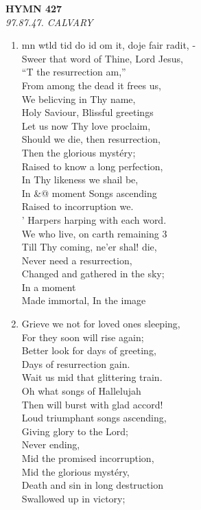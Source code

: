 \documentclass[11pt,a4paper]{article}
\begin{document}
\newpage
\begin{center}
    {\Large \textbf{HYMN 427}}
    \\
    \textit{97.87.47. CALVARY}
\end{center}
\vspace{1em}

\begin{enumerate}
    \item mn wtld tid do id om it, doje fair radit, - \\
        Sweer that word of Thine, Lord Jesus, \\
        ``T the resurrection am,'' \\
        From among the dead it frees us, \\
        We belicving in Thy name, \\
        Holy Saviour, Blissful greetings \\
        Let us now Thy love proclaim, \\
        Should we die, then resurrection, \\
        Then the glorious mystéry; \\
        Raised to know a long perfection, \\
        In Thy likeness we shail be, \\
        In \&@ moment Songs ascending \\
        Raised to incorruption we. \\
        ' Harpers harping with each word. \\
        We who live, on carth remaining 3 \\
        Till Thy coming, ne'er shal! die, \\
        Never need a resurrection, \\
        Changed and gathered in the sky; \\
        In a moment \\
        Made immortal, In the image

    \item Grieve we not for loved ones sleeping, \\
        For they soon will rise again; \\
        Better look for days of greeting, \\
        Days of resurrection gain. \\
        Wait us mid that glittering train. \\
        Oh what songs of Hallelujah \\
        Then will burst with glad accord! \\
        Loud triumphant songs ascending, \\
        Giving glory to the Lord; \\
        Never ending, \\
        Mid the promised incorruption, \\
        Mid the glorious mystéry, \\
        Death and sin in long destruction \\
        Swallowed up in victory;


\end{enumerate}
\end{document}
